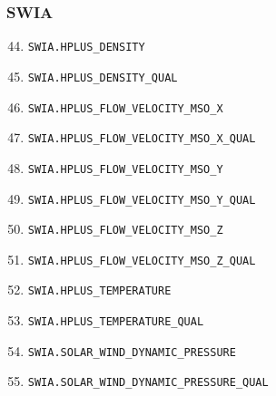 \documentclass{article}
\begin{document}
\subsubsection{SWIA}
\begin{enumerate}
\setcounter{enumi}{43}
    \item \texttt{SWIA.HPLUS\_DENSITY}
    \item \texttt{SWIA.HPLUS\_DENSITY\_QUAL}
    \item \texttt{SWIA.HPLUS\_FLOW\_VELOCITY\_MSO\_X}
    \item \texttt{SWIA.HPLUS\_FLOW\_VELOCITY\_MSO\_X\_QUAL}
    \item \texttt{SWIA.HPLUS\_FLOW\_VELOCITY\_MSO\_Y}
    \item \texttt{SWIA.HPLUS\_FLOW\_VELOCITY\_MSO\_Y\_QUAL}
    \item \texttt{SWIA.HPLUS\_FLOW\_VELOCITY\_MSO\_Z}
    \item \texttt{SWIA.HPLUS\_FLOW\_VELOCITY\_MSO\_Z\_QUAL}
    \item \texttt{SWIA.HPLUS\_TEMPERATURE}
    \item \texttt{SWIA.HPLUS\_TEMPERATURE\_QUAL}
    \item \texttt{SWIA.SOLAR\_WIND\_DYNAMIC\_PRESSURE}
    \item \texttt{SWIA.SOLAR\_WIND\_DYNAMIC\_PRESSURE\_QUAL}
\end{enumerate}
\end{document}

